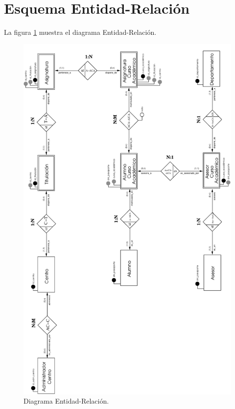 \section{Esquema Entidad-Relación}

   \paragraph{}La figura \ref{diagramaER} muestra el diagrama Entidad-Relación.

   \begin{figure}[!ht]
            \begin{center}
            \includegraphics[]{07.Modelo_Entidad-Interrelacion/7.4.Esquema_E-R/diagramaER.pdf}
            \caption{Diagrama Entidad-Relación.}
            \label{diagramaER}
            \end{center}
         \end{figure}